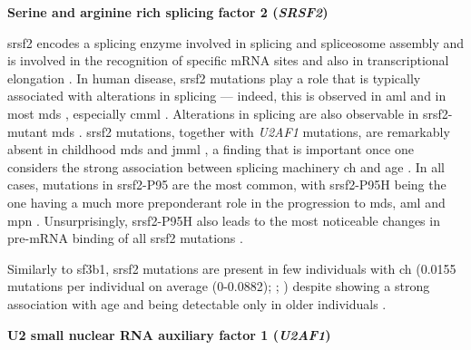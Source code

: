 \noindent \textbf{Serine and arginine rich splicing factor 2 (\textit{SRSF2})}

\Ac{srsf2} encodes a splicing enzyme involved in splicing and spliceosome assembly \cite{Fu1992-wy} and is involved in the recognition of specific mRNA sites \cite{Liu2000-ax} and also in transcriptional elongation \cite{Lin2008-tj}. In human disease, \ac{srsf2} mutations play a role that is typically associated with alterations in splicing --- indeed, this is observed in \ac{aml} \cite{Yoshimi2019-ax} and in most \ac{mds} \cite{Yoshida2011-zp,Makishima2012-wr}, especially \ac{cmml} \cite{Patnaik2013-cv,Meggendorfer2012-jn}. Alterations in splicing are also observable in \ac{srsf2}-mutant \ac{mds} \cite{Rahman2020-bh}. \ac{srsf2} mutations, together with \textit{U2AF1} mutations, are remarkably absent in childhood \ac{mds} and \ac{jmml} \cite{Hirabayashi2012-jj,Kar2013-nw}, a finding that is important once one considers the strong association between splicing machinery \ac{ch} and age \cite{Yoshida2011-zp}. In all cases, mutations in \ac{srsf2}-P95 are the most common, with \ac{srsf2}-P95H being the one having a much more preponderant role in the progression to \ac{mds}, \ac{aml} and \ac{mpn} \cite{Wang2021-wg,Smeets2018-yv,Nagata2019-hn}. Unsurprisingly, \ac{srsf2}-P95H also leads to the most noticeable changes in pre-mRNA binding of all \ac{srsf2} mutations \cite{Zhang2015-xu,Komeno2015-pq}.

Similarly to \ac{sf3b1}, \ac{srsf2} mutations are present in few individuals with \ac{ch} \cite{Jaiswal2014-rl,Genovese2014-eu,Zink2017-zi,Bolton2020-ct,Coombs2017-ph,McKerrell2015-rl,Acuna-Hidalgo2017-ng,Desai2018-pj,Young2016-du,Young2019-rz} (0.0155 mutations per individual on average (0-0.0882); ; ) despite showing a strong association with age and being detectable only in older individuals \cite{Bolton2020-ct,McKerrell2015-rl}.

\noindent \textbf{U2 small nuclear RNA auxiliary factor 1 (\textit{U2AF1})}

